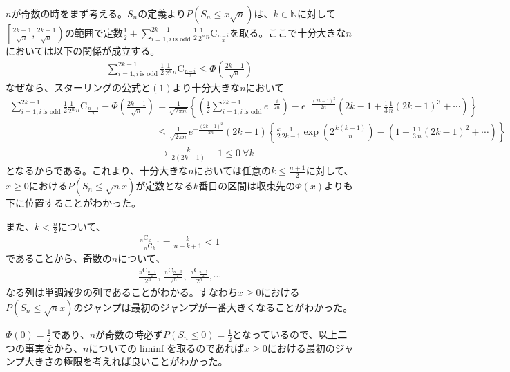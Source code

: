 \documentclass{article}
\begin{document}
$n$が奇数の時をまず考える。$S_n$の定義より$P\left( S_n \leq x \sqrt{n} \right)$は、$k\in\mathbb{N}$に対して$\left[ \frac{2k-1}{\sqrt{n}}, \frac{2k+1}{\sqrt{n}} \right)$の範囲で定数$\frac{1}{2} + \sum_{i=1, i\ \text{is odd}}^{2k-1} \frac{1}{2} \frac{1}{2^n} {}_n \mathrm{C} _\frac{n-i}{2}$を取る。ここで十分大きな$n$においては以下の関係が成立する。
\begin{align*}
	\sum_{i=1, i\ \text{is odd}}^{2k-1} \frac{1}{2} \frac{1}{2^n} {}_n \mathrm{C} _\frac{n-i}{2} \leq \Phi \left(\frac{2k-1}{\sqrt{n}} \right)
\end{align*}
なぜなら、スターリングの公式と$(1)$より十分大きな$n$において
\begin{align*}
	\sum_{i=1, i\ \text{is odd}}^{2k-1} \frac{1}{2} \frac{1}{2^n} {}_n \mathrm{C} _\frac{n-i}{2} - \Phi \left(\frac{2k-1}{\sqrt{n}} \right) &= \frac{1}{\sqrt{2\pi n}} \left\{ \left( \frac{1}{2} \sum_{i=1, i\ \text{is odd}}^{2k-1} e^{-\frac{i}{2n}}\right) - e^{- \frac{(2k-1)^2}{2n}} \left( 2k-1 + \frac{1}{3} \frac{1}{n} (2k-1)^3 + \cdots \right) \right\}\\[10pt]
	&\leq \frac{1}{\sqrt{2\pi n}} e^{- \frac{(2k-1)^2}{2n}} (2k-1) \left\{ \frac{k}{2} \frac{1}{2k-1}\exp \left(2 \frac{k(k-1)}{n}\right) - \left(1 + \frac{1}{3} \frac{1}{n} (2k-1)^2 + \cdots \right) \right\}\\[10pt]
	&\to \frac{k}{2(2k-1)} -1 \leq 0\ \forall k
\end{align*}
となるからである。これより、十分大きな$n$においては任意の$k \leq \frac{n+1}{2}$に対して、$x \geq 0$における$P\left( S_n \leq \sqrt{n} x \right)$が定数となる$k$番目の区間は収束先の$\Phi(x)$よりも下に位置することがわかった。

また、$k < \frac{n}{2}$について、
\begin{align}
	\frac{{}_n \mathrm{C} _{k-1}}{{}_n \mathrm{C} _{k}} = \frac{k}{n-k+1} < 1
\end{align}
であることから、奇数の$n$について、
\begin{align*}
	\frac{{}_n \mathrm{C} _\frac{n-1}{2}}{2^n},\ \frac{{}_n \mathrm{C} _\frac{n-3}{2}}{2^n},\ \frac{{}_n \mathrm{C} _\frac{n-5}{2}}{2^n}, \cdots
\end{align*}
なる列は単調減少の列であることがわかる。すなわち$x\geq 0$における$P\left( S_n \leq \sqrt{n} x \right)$のジャンプは最初のジャンプが一番大きくなることがわかった。

$\Phi(0) = \frac{1}{2}$であり、$n$が奇数の時必ず$P\left( S_n \leq 0 \right) = \frac{1}{2}$となっているので、以上二つの事実をから、$n$についての$\liminf$を取るのであれば$x\geq0$における最初のジャンプ大きさの極限を考えれば良いことがわかった。
\end{document}
